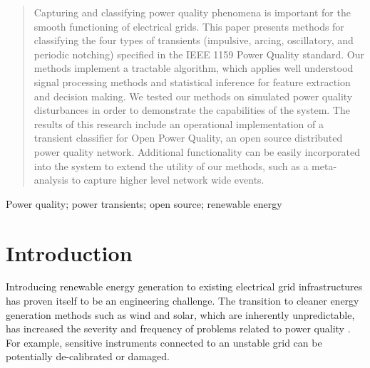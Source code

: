 \documentclass[10pt, conference, compsocconf]{IEEEtran}
\begin{document}




\maketitle


\begin{abstract}

Capturing and classifying power quality phenomena is important for the smooth functioning of electrical grids.  This paper presents methods for classifying the four types of transients (impulsive, arcing, oscillatory, and periodic notching) specified in the IEEE 1159 Power Quality standard. Our methods implement a tractable algorithm, which applies well understood signal processing methods and statistical inference for feature extraction and decision making. We tested our methods on simulated power quality disturbances in order to demonstrate the capabilities of the system. The results of this research include an operational implementation of a transient classifier for Open Power Quality, an open source distributed power quality network. Additional functionality can be easily incorporated into the system to extend the utility of our methods, such as a meta-analysis to capture higher level network wide events.

\end{abstract}

\begin{IEEEkeywords}
Power quality; power transients; open source; renewable energy%
\end{IEEEkeywords}



%
\IEEEpeerreviewmaketitle



\section{Introduction}

Introducing renewable energy generation to existing electrical grid infrastructures has proven itself to be an engineering challenge. The transition to cleaner energy generation methods such as wind and solar, which are inherently unpredictable, has increased the severity and frequency of problems related to power quality \cite{Radu:2014:RenewableImpacts}. For example, sensitive instruments connected to an unstable grid can be potentially de-calibrated or damaged.
\end{document}
